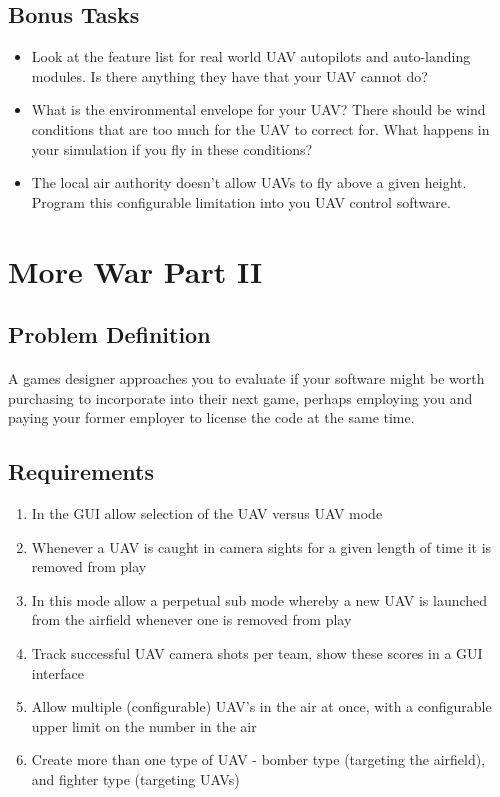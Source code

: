 \documentclass[11pt]{book}
\begin{document}
\subsection{Bonus Tasks}

\begin{itemize}
\item Look at the feature list for real world UAV autopilots and auto-landing modules. Is there anything they have that your UAV cannot do?
\item What is the environmental envelope for your UAV? There should be wind conditions that are too much for the UAV to correct for. What happens in your simulation if you fly in these conditions?
\item The local air authority doesn't allow UAVs to fly above a given height. Program this configurable limitation into you UAV control software.
\end{itemize}

\clearpage

\section{More War Part II}

\subsection{Problem Definition}

\paragraph{} A games designer approaches you to evaluate if your software
might be worth purchasing to incorporate into their next game, perhaps
employing you and paying your former employer to license the code at the same
time.

\subsection{Requirements}

\begin{enumerate}
\item In the GUI allow selection of the UAV versus UAV mode
\item Whenever a UAV is caught in camera sights for a given length of time it is removed from play
\item In this mode allow a perpetual sub mode whereby a new UAV is launched from the airfield whenever one is removed from play
\item Track successful UAV camera shots per team, show these scores in a GUI interface
\item Allow multiple (configurable) UAV's in the air at once, with a configurable upper limit on the number in the air
\item Create more than one type of UAV - bomber type (targeting the airfield), and fighter type (targeting UAVs)
\end{enumerate}
\end{document}
